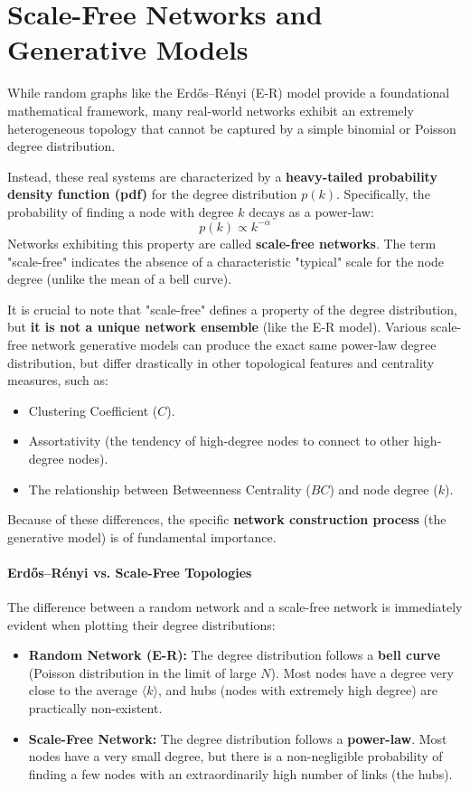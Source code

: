 \chapter[Scale-Free Networks and Generative Models]{Scale-Free Networks and\\Generative Models}

While random graphs like the Erdős–Rényi (E-R) model provide a foundational mathematical framework, many real-world networks exhibit an extremely heterogeneous topology that cannot be captured by a simple binomial or Poisson degree distribution.

Instead, these real systems are characterized by a \textbf{heavy-tailed probability density function (pdf)} for the degree distribution \( p(k) \). Specifically, the probability of finding a node with degree \( k \) decays as a power-law:
\[
    p(k) \propto k^{-\alpha}
\]
Networks exhibiting this property are called \textbf{scale-free networks}. The term "scale-free" indicates the absence of a characteristic "typical" scale for the node degree (unlike the mean of a bell curve).

It is crucial to note that "scale-free" defines a property of the degree distribution, but \textbf{it is not a unique network ensemble} (like the E-R model). Various scale-free network generative models can produce the exact same power-law degree distribution, but differ drastically in other topological features and centrality measures, such as:
\begin{itemize}
    \item Clustering Coefficient (\( C \)).
    \item Assortativity (the tendency of high-degree nodes to connect to other high-degree nodes).
    \item The relationship between Betweenness Centrality (\( BC \)) and node degree (\( k \)).
\end{itemize}
Because of these differences, the specific \textbf{network construction process} (the generative model) is of fundamental importance.

\subsubsection{Erdős–Rényi vs. Scale-Free Topologies}
The difference between a random network and a scale-free network is immediately evident when plotting their degree distributions:
\begin{itemize}
    \item \textbf{Random Network (E-R):} The degree distribution follows a \textbf{bell curve} (Poisson distribution in the limit of large \( N \)). Most nodes have a degree very close to the average \( \langle k \rangle \), and hubs (nodes with extremely high degree) are practically non-existent.
    \item \textbf{Scale-Free Network:} The degree distribution follows a \textbf{power-law}. Most nodes have a very small degree, but there is a non-negligible probability of finding a few nodes with an extraordinarily high number of links (the hubs).
\end{itemize}

